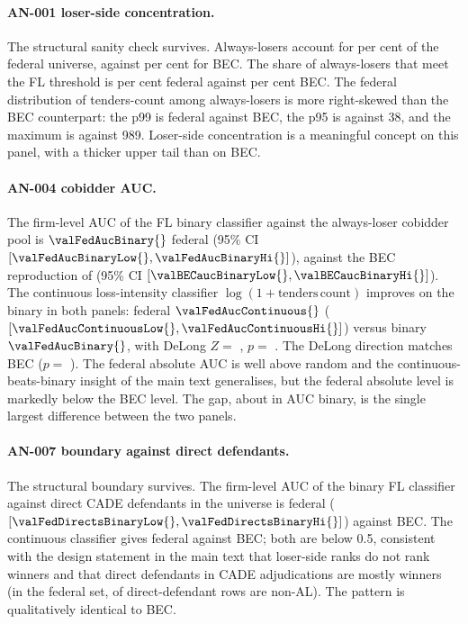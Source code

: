 \paragraph{AN-001 \textemdash{} loser-side concentration.}
The structural sanity check survives. Always-losers account for
\valFedALshare{} per cent of the federal universe, against
\valBECalShare{} per cent for BEC. The share of always-losers
that meet the FL threshold is \valFedFLshare{} per cent federal
against \valBECflShare{} per cent BEC. The federal distribution
of tenders-count among always-losers is more right-skewed than
the BEC counterpart: the p99 is \valFedTcPNinetyNine{} federal against
\valBECtcPNinetyNine{} BEC, the p95 is \valFedTcPNinetyFive{} against 38, and the
maximum is \valFedTcMax{} against 989. Loser-side concentration
is a meaningful concept on this panel, with a thicker upper tail
than on BEC.

\paragraph{AN-004 \textemdash{} cobidder AUC.}
The firm-level AUC of the FL binary classifier against the
always-loser cobidder pool is $\valFedAucBinary{}$ federal
(95\% CI $[\valFedAucBinaryLow{}, \valFedAucBinaryHi{}]$),
against the BEC reproduction of \valBECaucBinary{}
(95\% CI $[\valBECaucBinaryLow{}, \valBECaucBinaryHi{}]$). The
continuous loss-intensity classifier
$\log(1 + \mathrm{tenders\,count})$ improves on the binary in
both panels: federal $\valFedAucContinuous{}$
($[\valFedAucContinuousLow{}, \valFedAucContinuousHi{}]$) versus
binary $\valFedAucBinary{}$, with DeLong $Z =$ \valFedDelongZraw,
$p =$ \valFedDelongPraw. The DeLong direction matches BEC
($p =$ \valBECdelongPraw). The federal absolute AUC is well above
random and the continuous-beats-binary insight of the main text
generalises, but the federal absolute level is markedly below the
BEC level. The gap, about \valFedAucDrop{} in AUC binary, is the
single largest difference between the two panels.

\paragraph{AN-007 \textemdash{} boundary against direct
defendants.}
The structural boundary survives. The firm-level AUC of the
binary FL classifier against direct CADE defendants in the
universe is \valFedDirectsBinary{} federal
($[\valFedDirectsBinaryLow{}, \valFedDirectsBinaryHi{}]$) against
\valBECdirectsBinary{} BEC. The continuous classifier gives
\valFedDirectsContinuous{} federal against \valBECdirectsContinuous{}
BEC; both are below 0.5, consistent with the design statement in
the main text that loser-side ranks do not rank winners and that
direct defendants in CADE adjudications are mostly winners (in
the federal set, \valFedDirectsWinshare{} of \valFedDirects{}
direct-defendant rows are non-AL). The pattern is qualitatively
identical to BEC.


